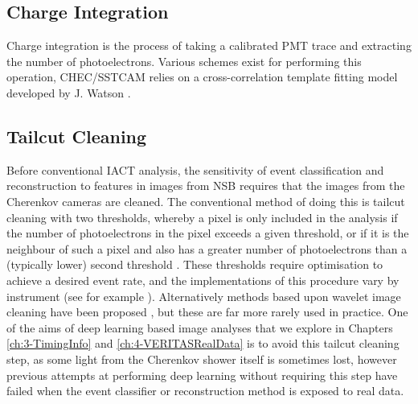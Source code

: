 \subsection{Charge Integration}

Charge integration is the process of taking a calibrated PMT trace and extracting the number of photoelectrons. Various schemes exist for performing this operation, CHEC/SSTCAM relies on a cross-correlation template fitting model developed by J. Watson \cite{jasonthesis}.

\subsection{Tailcut Cleaning}

Before conventional IACT analysis, the sensitivity of event classification and reconstruction to features in images from NSB requires that the images from the Cherenkov cameras are cleaned. The conventional method of doing this is tailcut cleaning with two thresholds, whereby a pixel is only included in the analysis if the number of photoelectrons in the pixel exceeds a given threshold, or if it is the neighbour of such a pixel and also has a greater number of photoelectrons than a (typically lower) second threshold \cite{hegratailcut}. These thresholds require optimisation to achieve a desired event rate, and the implementations of this procedure vary by instrument (see for example \cite{magictailcut}\cite{Benbow}\cite{magictime}). Alternatively methods based upon wavelet image cleaning have been proposed \cite{wavelet}, but these are far more rarely used in practice. One of the aims of deep learning based image analyses that we explore in Chapters \ref{ch:3-TimingInfo} and \ref{ch:4-VERITASRealData} is to avoid this tailcut cleaning step, as some light from the Cherenkov shower itself is sometimes lost, however previous attempts at performing deep learning without requiring this step have failed when the event classifier or reconstruction method is exposed to real data. 

